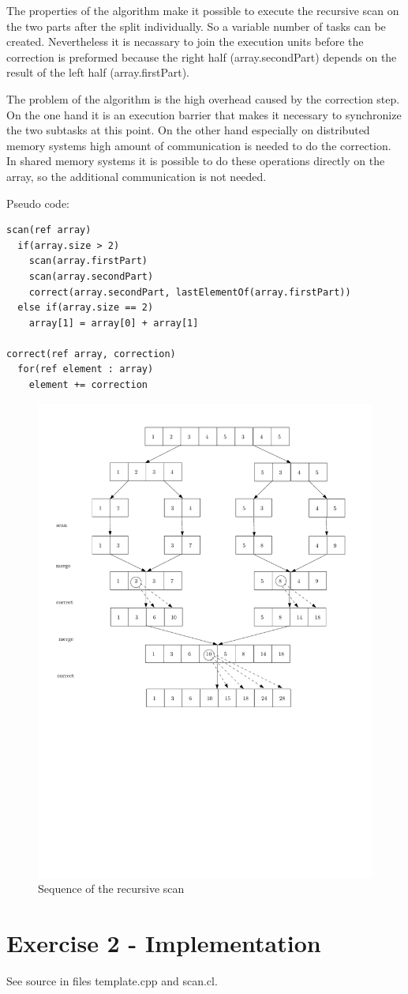 \documentclass[a4paper,twoside,11pt]{article}
\begin{document}
The properties of the algorithm make it possible to execute the recursive scan on the two parts after the split individually. So a variable number of tasks can be created. Nevertheless it is necassary to join the execution units before the correction is preformed because the right half (array.secondPart) depends on the result of the left half (array.firstPart). 

The problem of the algorithm is the high overhead caused by the correction step. On the one hand it is an execution barrier that makes it necessary to synchronize the two subtasks at this point. On the other hand especially on distributed memory systems high amount of communication is needed to do the correction. In shared memory systems it is possible to do these operations directly on the array, so the additional communication is not needed.

Pseudo code:
\begin{verbatim}
scan(ref array)
  if(array.size > 2)
    scan(array.firstPart)
    scan(array.secondPart)
    correct(array.secondPart, lastElementOf(array.firstPart))
  else if(array.size == 2)
    array[1] = array[0] + array[1]
	
correct(ref array, correction)
  for(ref element : array)
    element += correction
\end{verbatim}

\begin{figure}[hbtp]
\centering
\label{fig:para_algo}
\includegraphics[scale=.75]{recur3}
\caption{Sequence of the recursive scan}
\end{figure}

\section{Exercise 2 - Implementation}

See source in files template.cpp and scan.cl.
\end{document}
